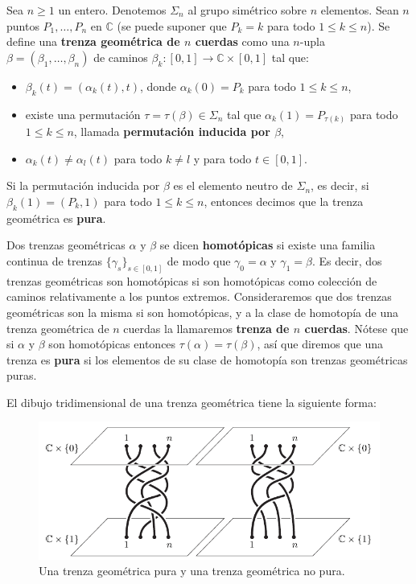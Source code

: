 \documentclass[bibtex, anon]{TEMat-article}
\newcommand{\CC}{\mathbb{C}}
\begin{document}
 \begin{defi}\label{geo}
 	Sea $n\geq 1$ un entero. Denotemos $\Sigma_n$ al grupo simétrico sobre $n$ elementos. Sean $n$ puntos $P_1,\dots, P_n$ en $\CC$ (se puede suponer que $P_k=k$ para todo $1\leq k\leq n$). Se define una \textbf{trenza geométrica de $n$ cuerdas} como una $n$-upla $\beta=(\beta_1,\dots,\beta_n)$ de caminos $\beta_k:[0,1]\to\CC\times[0,1]$ tal que:
 	\begin{itemize}
 		\item $\beta_k(t)=(\alpha_k(t),t)$, donde $\alpha_k(0)=P_k$ para todo $1\leq k\leq n$, 
 		\item existe una permutación $\tau=\tau(\beta)\in\Sigma_n$ tal que $\alpha_k(1)=P_{\tau(k)}$ para todo $1\leq k\leq n$, llamada \textbf{permutación inducida por $\beta$},
 		\item $\alpha_k(t)\neq \alpha_l(t)$ para todo $k\neq l$ y para todo $t\in[0,1]$.
 	\end{itemize}
 	Si la permutación inducida por $\beta$ es el elemento neutro de $\Sigma_n$, es decir, si $\beta_k(1)=(P_k,1)$ para todo $1\leq k\leq n$, entonces decimos que la trenza geométrica es \textbf{pura}.
 	
 	Dos trenzas geométricas $\alpha$ y $\beta$ se dicen \textbf{homotópicas} si existe una familia continua de trenzas $\{\gamma_s\}_{s\in[0,1]}$ de modo que $\gamma_0=\alpha$ y $\gamma_1=\beta$. Es decir, dos trenzas geométricas son homotópicas si son homotópicas como colección de caminos relativamente a los puntos extremos. Consideraremos que dos trenzas geométricas son la misma si son homotópicas, y a la clase de homotopía de una trenza geométrica de $n$ cuerdas la llamaremos \textbf{trenza de $n$ cuerdas}. Nótese que si $\alpha$ y $\beta$ son homotópicas entonces $\tau(\alpha)=\tau(\beta)$, así que diremos que una trenza es \textbf{pura} si los elementos de su clase de homotopía son trenzas geométricas puras.
 \end{defi}

El dibujo tridimensional de una trenza geométrica tiene la siguiente forma:
\begin{figure}[h!]
	\centering
	\includegraphics[scale=0.6]{Imagenes/hilos}
	\caption{Una trenza geométrica pura y una trenza geométrica no pura.}\label{hilos}
\end{figure}
\end{document}
